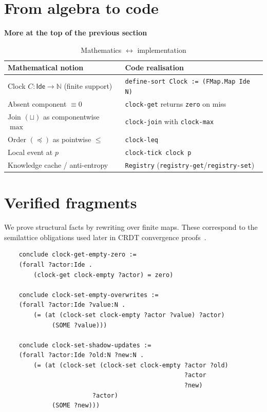\section{From algebra to code}
\textbf{More at the top of the previous section}
\begin{table}[h]
  \centering
  \caption{Mathematics $\leftrightarrow$ implementation}\label{tab:math-code}
  \begin{tabular}{@{}ll@{}}
    \toprule
    Mathematical notion & Code realisation \\ \midrule
    Clock $C:\mathsf{Ide}\to\mathbb{N}$ (finite support) & \texttt{define-sort Clock := (FMap.Map Ide N)} \\
    Absent component $\equiv 0$                           & \texttt{clock-get} returns \texttt{zero} on miss \\
    Join $(\sqcup)$ as componentwise $\max$               & \texttt{clock-join} with \texttt{clock-max} \\
    Order $(\preceq)$ as pointwise $\le$                  & \texttt{clock-leq} \\
    Local event at $p$                                    & \texttt{clock-tick clock p} \\
    Knowledge cache / anti-entropy                        & \texttt{Registry} (\texttt{registry-get}/\texttt{registry-set}) \\ \bottomrule
  \end{tabular}
\end{table}

\section{Verified fragments}\label{sec:vc-props}

We prove structural facts by rewriting over finite maps. These correspond to the semilattice obligations used later in CRDT convergence proofs~\cite{shapiro2011conflict}.

\begin{lstlisting}
    conclude clock-get-empty-zero :=
    (forall ?actor:Ide .
        (clock-get clock-empty ?actor) = zero)

    conclude clock-set-empty-overwrites :=
    (forall ?actor:Ide ?value:N .
        (= (at (clock-set clock-empty ?actor ?value) ?actor)
             (SOME ?value)))

    conclude clock-set-shadow-updates :=
    (forall ?actor:Ide ?old:N ?new:N .
        (= (at (clock-set (clock-set clock-empty ?actor ?old)
                                                 ?actor
                                                 ?new)
                        ?actor)
             (SOME ?new)))
\end{lstlisting}

